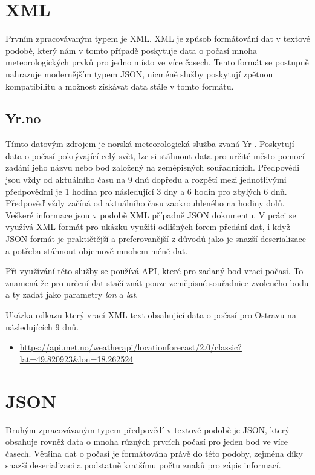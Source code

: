 \documentclass[czech,bachelor,dept460,male,csharp,cpdeclaration]{diploma}
\begin{document}
	\section{XML}
	
	Prvním zpracovávaným typem je XML. XML je způsob formátování dat v textové podobě, který nám v tomto případě poskytuje data o počasí mnoha meteorologických prvků pro jedno místo ve více časech. Tento formát se postupně nahrazuje modernějším typem JSON, nicméně služby poskytují zpětnou kompatibilitu a možnost získávat data stále v tomto formátu.
	
	\subsection{Yr.no}
	
	Tímto datovým zdrojem je norská meteorologická služba zvaná Yr \cite{yrno}. Poskytují data o počasí pokrývající celý svět, lze si stáhnout data pro určité město pomocí zadání jeho názvu nebo bod založený na zeměpisných souřadnicích. Předpovědi jsou vždy od aktuálního času na 9 dnů dopředu a rozpětí mezi jednotlivými předpověďmi je 1 hodina pro následující 3 dny a 6 hodin pro zbylých 6 dnů. Předpověď vždy začíná od aktuálního času zaokrouhleného na hodiny dolů. Veškeré informace jsou v podobě XML případně JSON dokumentu. V práci se využívá XML formát pro ukázku využití odlišných forem předání dat, i když JSON formát je praktičtější a preferovanější z důvodů jako je snazší deserializace a potřeba stáhnout objemově mnohem méně dat.
	
	Při využívání této služby se používá API, které pro zadaný bod vrací počasí. To znamená že pro určení dat stačí znát pouze zeměpisné souřadnice zvoleného bodu a ty zadat jako parametry {\it lon} a {\it lat}.
	
	Ukázka odkazu který vrací XML text obsahující data o počasí pro Ostravu na následujících 9 dnů.
	\begin{itemize}
		\item \url{https://api.met.no/weatherapi/locationforecast/2.0/classic?lat=49.820923\&lon=18.262524}
	\end{itemize}
	
	\section{JSON}
	
	Druhým zpracovávaným typem předpovědí v textové podobě je JSON, který obsahuje rovněž data o mnoha různých prvcích počasí pro jeden bod ve více časech. Většina dat o počasí je formátována právě do této podoby, zejména díky snazší deserializaci a podstatně kratšímu počtu znaků pro zápis informací.
	
\end{document}
